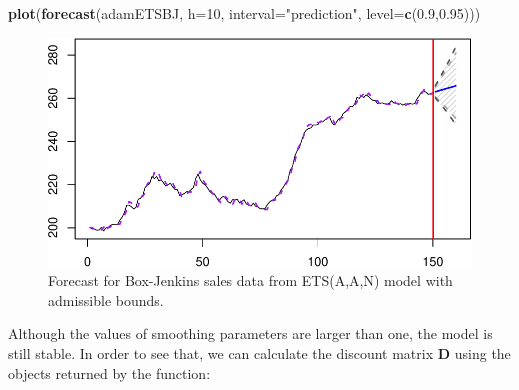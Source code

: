 \documentclass[]{book}
\newenvironment{Shaded}{\begin{snugshade}}{\end{snugshade}}
\newcommand{\DataTypeTok}[1]{\textcolor[rgb]{0.13,0.29,0.53}{#1}}
\newcommand{\DecValTok}[1]{\textcolor[rgb]{0.00,0.00,0.81}{#1}}
\newcommand{\FloatTok}[1]{\textcolor[rgb]{0.00,0.00,0.81}{#1}}
\newcommand{\KeywordTok}[1]{\textcolor[rgb]{0.13,0.29,0.53}{\textbf{#1}}}
\newcommand{\NormalTok}[1]{#1}
\newcommand{\OperatorTok}[1]{\textcolor[rgb]{0.81,0.36,0.00}{\textbf{#1}}}
\newcommand{\OtherTok}[1]{\textcolor[rgb]{0.56,0.35,0.01}{#1}}
\newcommand{\StringTok}[1]{\textcolor[rgb]{0.31,0.60,0.02}{#1}}
\theoremstyle{definition}
\theoremstyle{definition}
\theoremstyle{definition}
\theoremstyle{definition}
\theoremstyle{remark}
\begin{document}
\begin{Shaded}
\begin{Highlighting}[]
\KeywordTok{plot}\NormalTok{(}\KeywordTok{forecast}\NormalTok{(adamETSBJ, }\DataTypeTok{h=}\DecValTok{10}\NormalTok{,}
              \DataTypeTok{interval=}\StringTok{"prediction"}\NormalTok{, }\DataTypeTok{level=}\KeywordTok{c}\NormalTok{(}\FloatTok{0.9}\NormalTok{,}\FloatTok{0.95}\NormalTok{)))}
\end{Highlighting}
\end{Shaded}

\begin{figure}
\centering
\includegraphics{Svetunkov--2022----ADAM_files/figure-latex/BJsalesAANForecastAdmissible-1.pdf}
\caption{\label{fig:BJsalesAANForecastAdmissible}Forecast for Box-Jenkins sales data from ETS(A,A,N) model with admissible bounds.}
\end{figure}

Although the values of smoothing parameters are larger than one, the model is still stable. In order to see that, we can calculate the discount matrix \(\mathbf{D}\) using the objects returned by the function:

\begin{Shaded}
\end{Shaded}
\end{document}
